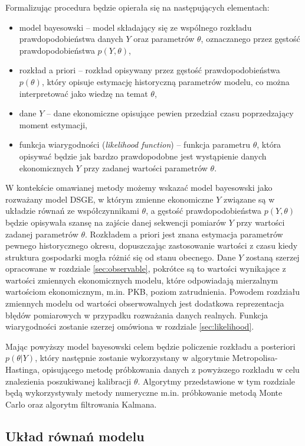 Formalizując procedura będzie opierała się na następujących elementach:
\begin{itemize}
    \item model bayesowski -- model składający się ze wspólnego rozkładu prawdopodobieństwa danych $Y$ oraz parametrów $\theta$, oznaczanego przez gęstość prawdopodobieństwa $p(Y, \theta)$,
    \item rozkład a priori -- rozkład opisywany przez gęstość prawdopodobieństwa $p(\theta)$, który opisuje estymację historyczną parametrów modelu, co można interpretować jako wiedzę na temat $\theta$,
    \item dane $Y$ -- dane ekonomiczne opisujące pewien przedział czasu poprzedzający moment estymacji,
    \item funkcja wiarygodności (\emph{likelihood function}) -- funkcja parametru $\theta$, która opisywać będzie jak bardzo prawdopodobne jest wystąpienie danych ekonomicznych $Y$ przy zadanej wartości parametrów $\theta$.
\end{itemize}
W kontekście omawianej metody możemy wskazać model bayesowski jako rozważany model DSGE, w którym zmienne ekonomiczne $Y$ związane są w układzie równań ze współczynnikami $\theta$, a gęstość prawdopodobieństwa $p(Y, \theta)$ będzie opisywała szansę na zajście danej sekwencji pomiarów $Y$ przy wartości zadanej parametrów $\theta$. Rozkładem a priori jest znana estymacja parametrów pewnego historycznego okresu, dopuszczając zastosowanie wartości z czasu kiedy struktura gospodarki mogła różnić się od stanu obecnego. Dane $Y$ zostaną szerzej opracowane w rozdziale \ref{sec:observable}, pokrótce są to wartości wynikające z wartości zmiennych ekonomicznych modelu, które odpowiadają mierzalnym wartościom ekonomicznym, m.in. PKB, poziom zatrudnienia. Powodem rozdziału zmiennych modelu od wartości obserwowalnych jest dodatkowa reprezentacja błędów pomiarowych w przypadku rozważania danych realnych.  Funkcja wiarygodności zostanie szerzej omówiona w rozdziale \ref{sec:likelihood}. 

Mając powyższy model bayesowski celem będzie policzenie rozkładu a posteriori $p(\theta|Y)$, który następnie zostanie wykorzystany w algorytmie Metropolisa-Hastinga, opisującego metodę próbkowania danych z powyższego rozkładu w celu znalezienia poszukiwanej kalibracji $\theta$. Algorytmy przedstawione w tym rozdziale będą wykorzystywały metody numeryczne m.in. próbkowanie metodą Monte Carlo oraz algorytm filtrowania Kalmana.

\subsection{Układ równań modelu}

